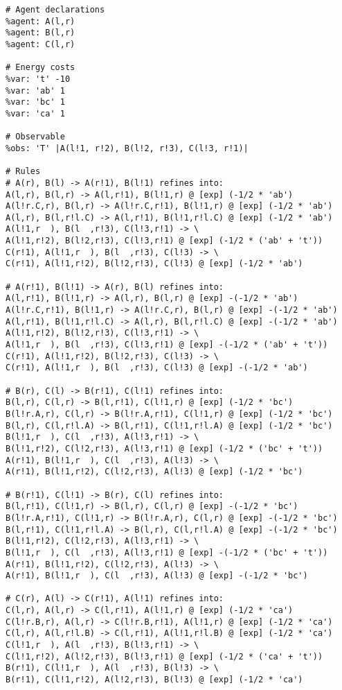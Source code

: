 \begin{lstlisting}[language=kappa]
# Agent declarations
%agent: A(l,r)
%agent: B(l,r)
%agent: C(l,r)

# Energy costs
%var: 't' -10
%var: 'ab' 1
%var: 'bc' 1
%var: 'ca' 1

# Observable
%obs: 'T' |A(l!1, r!2), B(l!2, r!3), C(l!3, r!1)|

# Rules
# A(r), B(l) -> A(r!1), B(l!1) refines into:
A(l,r), B(l,r) -> A(l,r!1), B(l!1,r) @ [exp] (-1/2 * 'ab')
A(l!r.C,r), B(l,r) -> A(l!r.C,r!1), B(l!1,r) @ [exp] (-1/2 * 'ab')
A(l,r), B(l,r!l.C) -> A(l,r!1), B(l!1,r!l.C) @ [exp] (-1/2 * 'ab')
A(l!1,r  ), B(l  ,r!3), C(l!3,r!1) -> \
A(l!1,r!2), B(l!2,r!3), C(l!3,r!1) @ [exp] (-1/2 * ('ab' + 't'))
C(r!1), A(l!1,r  ), B(l  ,r!3), C(l!3) -> \
C(r!1), A(l!1,r!2), B(l!2,r!3), C(l!3) @ [exp] (-1/2 * 'ab')

# A(r!1), B(l!1) -> A(r), B(l) refines into:
A(l,r!1), B(l!1,r) -> A(l,r), B(l,r) @ [exp] -(-1/2 * 'ab')
A(l!r.C,r!1), B(l!1,r) -> A(l!r.C,r), B(l,r) @ [exp] -(-1/2 * 'ab')
A(l,r!1), B(l!1,r!l.C) -> A(l,r), B(l,r!l.C) @ [exp] -(-1/2 * 'ab')
A(l!1,r!2), B(l!2,r!3), C(l!3,r!1) -> \
A(l!1,r  ), B(l  ,r!3), C(l!3,r!1) @ [exp] -(-1/2 * ('ab' + 't'))
C(r!1), A(l!1,r!2), B(l!2,r!3), C(l!3) -> \
C(r!1), A(l!1,r  ), B(l  ,r!3), C(l!3) @ [exp] -(-1/2 * 'ab')

# B(r), C(l) -> B(r!1), C(l!1) refines into:
B(l,r), C(l,r) -> B(l,r!1), C(l!1,r) @ [exp] (-1/2 * 'bc')
B(l!r.A,r), C(l,r) -> B(l!r.A,r!1), C(l!1,r) @ [exp] (-1/2 * 'bc')
B(l,r), C(l,r!l.A) -> B(l,r!1), C(l!1,r!l.A) @ [exp] (-1/2 * 'bc')
B(l!1,r  ), C(l  ,r!3), A(l!3,r!1) -> \
B(l!1,r!2), C(l!2,r!3), A(l!3,r!1) @ [exp] (-1/2 * ('bc' + 't'))
A(r!1), B(l!1,r  ), C(l  ,r!3), A(l!3) -> \
A(r!1), B(l!1,r!2), C(l!2,r!3), A(l!3) @ [exp] (-1/2 * 'bc')

# B(r!1), C(l!1) -> B(r), C(l) refines into:
B(l,r!1), C(l!1,r) -> B(l,r), C(l,r) @ [exp] -(-1/2 * 'bc')
B(l!r.A,r!1), C(l!1,r) -> B(l!r.A,r), C(l,r) @ [exp] -(-1/2 * 'bc')
B(l,r!1), C(l!1,r!l.A) -> B(l,r), C(l,r!l.A) @ [exp] -(-1/2 * 'bc')
B(l!1,r!2), C(l!2,r!3), A(l!3,r!1) -> \
B(l!1,r  ), C(l  ,r!3), A(l!3,r!1) @ [exp] -(-1/2 * ('bc' + 't'))
A(r!1), B(l!1,r!2), C(l!2,r!3), A(l!3) -> \
A(r!1), B(l!1,r  ), C(l  ,r!3), A(l!3) @ [exp] -(-1/2 * 'bc')

# C(r), A(l) -> C(r!1), A(l!1) refines into:
C(l,r), A(l,r) -> C(l,r!1), A(l!1,r) @ [exp] (-1/2 * 'ca')
C(l!r.B,r), A(l,r) -> C(l!r.B,r!1), A(l!1,r) @ [exp] (-1/2 * 'ca')
C(l,r), A(l,r!l.B) -> C(l,r!1), A(l!1,r!l.B) @ [exp] (-1/2 * 'ca')
C(l!1,r  ), A(l  ,r!3), B(l!3,r!1) -> \
C(l!1,r!2), A(l!2,r!3), B(l!3,r!1) @ [exp] (-1/2 * ('ca' + 't'))
B(r!1), C(l!1,r  ), A(l  ,r!3), B(l!3) -> \
B(r!1), C(l!1,r!2), A(l!2,r!3), B(l!3) @ [exp] (-1/2 * 'ca')


\end{lstlisting}
